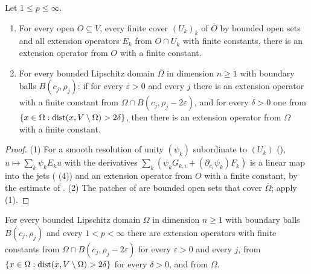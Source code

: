 \begin{lemma}
\label{lem:sobolev-extension-op-pasting}
\leanok
{}
Let $1 \leq p \leq \infty$.
\begin{enumerate}
  \item For every open $O \subseteq V$, every finite cover $(U_k)_k$ of $\overline O$ by bounded
    open sets and all extension operators $E_k$ from $O \cap U_k$ with finite constants, there is
    an extension operator from $O$ with a finite constant.
  \item For every bounded Lipschitz domain $\Omega$ in dimension $n \geq 1$ with boundary balls
    $B(c_j, \rho_j)$: if for every $\varepsilon > 0$ and every $j$ there is an extension operator
    with a finite constant from $\Omega \cap B(c_j, \rho_j - 2 \varepsilon)$, and for every
    $\delta > 0$ one from $\{x \in \Omega : \operatorname{dist}(x, V \setminus \Omega) > 2 \delta\}$, then there
    is an extension operator from $\Omega$ with a finite constant.
\end{enumerate}
\end{lemma}

\begin{proof}
\leanok
(1) For a smooth resolution of unity $(\psi_k)$ subordinate to $(U_k)$
(), $u \mapsto \sum_k \psi_k E_k u$ with the derivatives
$\sum_k (\psi_k G_{k,i} + (\partial_{e_i} \psi_k) F_k)$ is a linear map into the jets
( (4)) and an extension operator from $O$ with a finite constant, by the
estimate of . (2) The patches of 
are bounded open sets that cover $\overline\Omega$; apply (1).
\end{proof}

\begin{theorem}
\label{thm:sobolev-extension-operator}
\leanok
{}
For every bounded Lipschitz domain $\Omega$ in dimension $n \geq 1$ with boundary balls
$B(c_j, \rho_j)$ and every $1 < p < \infty$ there are extension operators with finite constants
from $\Omega \cap B(c_j, \rho_j - 2 \varepsilon)$ for every $\varepsilon > 0$ and every $j$, from
$\{x \in \Omega : \operatorname{dist}(x, V \setminus \Omega) > 2 \delta\}$ for every $\delta > 0$, and from
$\Omega$.
\end{theorem}

